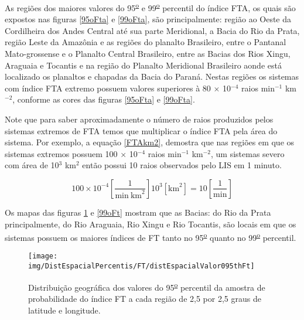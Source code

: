 As regiões dos maiores valores do 95\textsuperscript{\underline{o}} e 99\textsuperscript{\underline{o}} percentil do índice FTA, os quais são expostos nas figuras \ref{95oFta} e \ref{99oFta}, são principalmente:  região ao Oeste da Cordilheira dos Andes Central até sua parte Meridional, a Bacia do Rio da Prata, região Leste da Amazônia e as regiões do planalto Brasileiro, entre o Pantanal Mato-grossense e o Planalto Central Brasileiro, entre as Bacias dos Rios Xingu, Araguaia e Tocantis e na região do Planalto Meridional Brasileiro aonde está localizado os planaltos e chapadas da Bacia do Paraná. Nestas regiões os sistemas com índice FTA extremo possuem valores superiores à 80 $\times$ 10$^{-4}$ raios min$^{-1}$ km$^{-2}$, conforme as cores das figuras \ref{95oFta} e \ref{99oFta}. 


Note que para saber aproximadamente o número de raios produzidos pelos sistemas extremos de FTA temos que multiplicar o índice FTA pela área do sistema. Por exemplo, a equação \ref{FTAkm2}, demostra que nas regiões em que os sistemas extremos possuem 100 $\times$ 10$^{-4}$ raios min$^{-1}$ km$^{-2}$, um sistemas severo com área de 10$^3$ km$^2$ então possui 10 raios observados pelo LIS em 1 minuto.  

\begin{equation}
100 \times 10^{-4} \left[ \frac{\mathrm{1}}{\mathrm{min}~\mathrm{km}^2} \right]  10^3 [ \mathrm{km}^2 ] = 10 \left[ \frac{\mathrm{1}}{\mathrm{min}}\right]  
\label{FTAkm2}
\end{equation}

Os mapas das figuras \ref{95oFt} e \ref{99oFt} mostram que as Bacias: do Rio da Prata principalmente, do Rio Araguaia, Rio Xingu e Rio Tocantis, são locais em que os sistemas possuem os maiores índices de FT tanto no 95\textsuperscript{\underline{o}} quanto no 99\textsuperscript{\underline{o}} percentil.

\begin{figure}[!ht]
\centering
{\texttt{[image: img/DistEspacialPercentis/FT/distEspacialValor095thFt]}} 
\caption{Distribuição geográfica dos valores do 95\textsuperscript{\underline{o}} percentil da amostra de probabilidade do índice FT a cada região de 2,5 por 2,5 graus de latitude e longitude.}
\label{95oFt}
\end{figure} 
  
